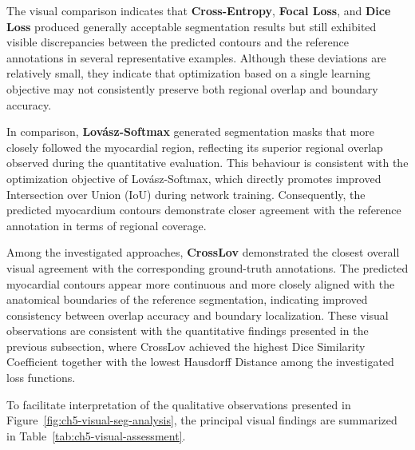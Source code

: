 The visual comparison indicates that \textbf{Cross-Entropy}, \textbf{Focal Loss}, and \textbf{Dice Loss} produced generally acceptable segmentation results but still exhibited visible discrepancies between the predicted contours and the reference annotations in several representative examples. Although these deviations are relatively small, they indicate that optimization based on a single learning objective may not consistently preserve both regional overlap and boundary accuracy.

In comparison, \textbf{Lovász-Softmax} generated segmentation masks that more closely followed the myocardial region, reflecting its superior regional overlap observed during the quantitative evaluation. This behaviour is consistent with the optimization objective of Lovász-Softmax, which directly promotes improved Intersection over Union (IoU) during network training. Consequently, the predicted myocardium contours demonstrate closer agreement with the reference annotation in terms of regional coverage.

Among the investigated approaches, \textbf{CrossLov} demonstrated the closest overall visual agreement with the corresponding ground-truth annotations. The predicted myocardial contours appear more continuous and more closely aligned with the anatomical boundaries of the reference segmentation, indicating improved consistency between overlap accuracy and boundary localization. These visual observations are consistent with the quantitative findings presented in the previous subsection, where CrossLov achieved the highest Dice Similarity Coefficient together with the lowest Hausdorff Distance among the investigated loss functions.

To facilitate interpretation of the qualitative observations presented in Figure~\ref{fig:ch5-visual-seg-analysis}, the principal visual findings are summarized in Table~\ref{tab:ch5-visual-assessment}.

